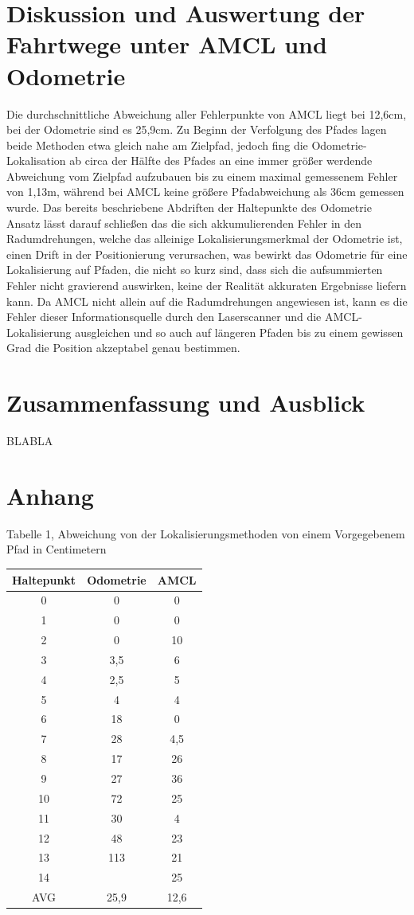 \documentclass[11pt,a4paper]{article}
\begin{document}
\section{Diskussion und Auswertung der Fahrtwege unter AMCL und Odometrie}
Die durchschnittliche Abweichung aller Fehlerpunkte von AMCL liegt bei 12,6cm, bei der Odometrie sind es 25,9cm. Zu Beginn der Verfolgung des Pfades lagen beide Methoden 
etwa gleich nahe am Zielpfad, jedoch fing die Odometrie-Lokalisation  ab circa der Hälfte des Pfades an eine immer größer werdende Abweichung vom Zielpfad aufzubauen bis 
zu einem maximal gemessenem Fehler von 1,13m, während bei AMCL keine größere Pfadabweichung als 36cm gemessen wurde. Das bereits beschriebene Abdriften der 
Haltepunkte des Odometrie Ansatz lässt darauf schließen das die sich akkumulierenden Fehler in den Radumdrehungen, welche das alleinige Lokalisierungsmerkmal 
der Odometrie ist, einen Drift in der Positionierung verursachen, was bewirkt das Odometrie für eine Lokalisierung auf Pfaden, die nicht so kurz sind, dass sich die
aufsummierten Fehler nicht gravierend auswirken, keine der Realität akkuraten Ergebnisse liefern kann. Da AMCL nicht allein auf die Radumdrehungen angewiesen ist, kann es 
die Fehler dieser Informationsquelle durch den Laserscanner und die AMCL-Lokalisierung ausgleichen und so auch auf längeren Pfaden bis zu einem gewissen Grad die Position 
akzeptabel genau bestimmen.

\section{Zusammenfassung und Ausblick}
BLABLA

\section{Anhang}
\caption{Tabelle 1, Abweichung von der Lokalisierungsmethoden von einem Vorgegebenem Pfad in Centimetern}
\begin{tabular}{c|c|c}
	\textbf{Haltepunkt} & \textbf{Odometrie} & \textbf{AMCL} \\
	\hline
0&	0&	0&\\
1&	0&	0&\\
2&	0&	10&\\
3&	3,5&	6&\\
4&	2,5&	5&\\
5&	4&	4&\\
6&	18&	0&\\
7&	28&	4,5&\\
8&	17&	26&\\
9&	27&	36&\\
10&	72&	25&\\
11&	30&	4&\\
12&	48&	23&\\
13&	113&	21&\\
14&	&	25&\\
\hline
AVG& 25,9& 12,6& \\

\end{tabular}

{%

}
\end{document}
